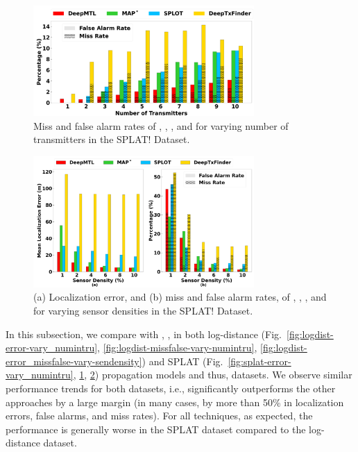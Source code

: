 \begin{figure}[ht]
	\centering
	\includegraphics[width=0.75\textwidth]{chapters/wowmom-pmc/figures/splat-missfalse_vary_numintru.png}
    \vspace{-0.1in}
	\caption{Miss and false alarm rates of \our, \map, \splot, and \deeptx for varying number of transmitters in the SPLAT! Dataset.}
	\label{fig:splat-missfalse-vary-numintru}
\end{figure}


\begin{figure}[ht]
	\centering
	\includegraphics[width=0.75\textwidth]{chapters/wowmom-pmc/figures/splat-error_missfalse_vary_sendensity.png}
    \vspace{-0.1in}
	\caption{(a) Localization error, and (b) miss and false alarm rates, of \our, \map, \splot, and \deeptx for varying sensor densities in the SPLAT! Dataset.}
	\label{fig:splat-error-vary-sendensity}
\end{figure}



In this subsection, we compare \our with \splot, \map, \deeptx in both log-distance (Fig.~\ref{fig:logdist-error-vary_numintru}, \ref{fig:logdist-missfalse-vary-numintru}, \ref{fig:logdist-error_missfalse-vary-sendensity}) and SPLAT (Fig.~\ref{fig:splat-error-vary_numintru}, \ref{fig:splat-missfalse-vary-numintru}, \ref{fig:splat-error-vary-sendensity}) propagation models and thus, datasets.
We observe similar performance trends for both datasets, i.e., 
\our significantly outperforms the other approaches by a large margin (in many cases, by more
than 50\% in localization errors, false alarms, and miss rates). For all techniques, as expected,
the performance is generally worse in the SPLAT dataset compared to the log-distance dataset.

